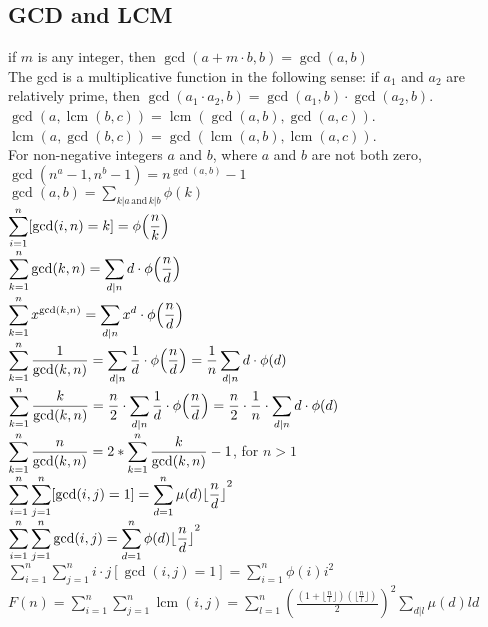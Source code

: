 \begin{multicols*}{\MCOLS}
\subsection{GCD and LCM}
if $m$ is any integer, then $\displaystyle \gcd(a + m {\cdot} b, b) = \gcd(a, b)$ \\
The gcd is a multiplicative function in the following sense: if $\displaystyle a_1$ and $\displaystyle a_2$ are relatively prime, then $\displaystyle \gcd(a_1 \cdot a_2, b) = \gcd(a_1, b) \cdot \gcd(a_2,b )$. \\
$\displaystyle \gcd(a, \operatorname{lcm}(b, c)) = \operatorname{lcm}(\gcd(a, b), \gcd(a, c))$. \\
$\displaystyle \operatorname{lcm}(a, \gcd(b, c)) = \gcd(\operatorname{lcm}(a, b), \operatorname{lcm}(a, c))$. \\
For non-negative integers $\displaystyle a$ and $b$, where $\displaystyle a$ and $b$ are not both zero, $\displaystyle \gcd({n^a} - 1, {n^b} - 1) = n^{\gcd(a,b)} - 1$ \\
$\displaystyle \gcd(a, b) = \displaystyle \sum_{k|a \, \text{and} \, k|b} {\phi(k)}$ \\
$\displaystyle \displaystyle \sum_{i=1}^n [\gcd(i, n) = k] = { \phi{\left(\frac{n}{k}\right)}}$ \\
$\displaystyle \displaystyle \sum_{k=1}^n \gcd(k, n) = \displaystyle \sum_{d|n} d \cdot {\phi{\left(\frac{n}{d}\right)}}$ \\
$\displaystyle \displaystyle \sum_{k=1}^n x^{\gcd(k,n)} = \displaystyle \sum_{d|n} x^d \cdot {\phi{\left(\frac{n}{d}\right)}}$ \\
$\displaystyle \displaystyle \sum_{k=1}^n \frac{1}{\gcd(k, n)} = \displaystyle \sum_{d|n} \frac{1}{d} \cdot {\phi{\left(\frac{n}{d}\right)}} = \frac{1}{n} \displaystyle \sum_{d|n} d \cdot \phi(d)$ \\
$\displaystyle \displaystyle \sum_{k=1}^n \frac{k}{\gcd(k, n)} = \frac{n}{2} \cdot \displaystyle \sum_{d|n} \frac{1}{d} \cdot {\phi{\left(\frac{n}{d}\right)}} = \frac{n}{2} \cdot \frac{1}{n} \cdot \displaystyle \sum_{d|n} d \cdot \phi(d)$ \\
$\displaystyle \displaystyle \sum_{k=1}^n \frac{n}{\gcd(k, n)} = 2 * \displaystyle \sum_{k=1}^n \frac{k}{\gcd(k, n)} - 1$, for $n > 1$ \\
$\displaystyle \displaystyle \sum_{i=1}^n \sum_{j=1}^n [\gcd(i, j) = 1] = \displaystyle \sum_{d=1}^n \mu(d) \lfloor {\frac{n}{d} \rfloor}^2$ \\
$\displaystyle \displaystyle \sum_{i=1}^n \displaystyle\sum_{j=1}^n \gcd(i, j) = \displaystyle \sum_{d=1}^n \phi(d) \lfloor {\frac{n}{d} \rfloor}^2$ \\
$\displaystyle \sum_{i=1}^n \sum_{j=1}^n i \cdot j[\gcd(i, j) = 1] = \sum_{i=1}^n \phi(i)i^2$ \\
$\displaystyle F(n) = \displaystyle \sum_{i=1}^n \displaystyle \sum_{j=1}^n \operatorname{lcm}(i, j) = \displaystyle \sum_{l=1}^n {\left(\frac{\left( 1 + \lfloor{\frac{n}{l} \rfloor} \right) \left( \lfloor{\frac{n}{l} \rfloor} \right)} {2} \right)}^2 \displaystyle \sum_{d|l} \mu(d)ld$ \\
\end{multicols*}